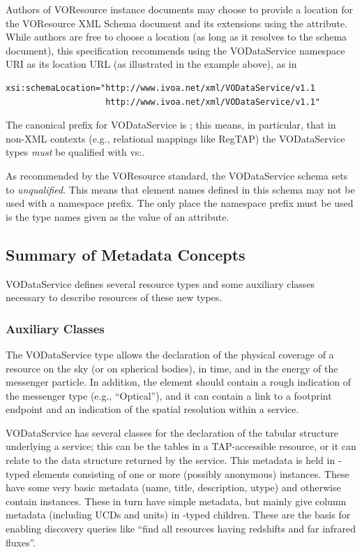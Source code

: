 \documentclass[11pt,a4paper]{ivoa}
\begin{document}
Authors of VOResource instance documents may choose to
provide a location for the VOResource XML Schema document and its
extensions using the
 attribute.  While authors are free to
choose a location (as long as it resolves to the schema document), this
specification
recommends using the VODataService namespace URI as its location URL
(as illustrated in the example above), as in
\begin{verbatim}
xsi:schemaLocation="http://www.ivoa.net/xml/VODataService/v1.1
                    http://www.ivoa.net/xml/VODataService/v1.1"
\end{verbatim}

The canonical prefix for VODataService is ; this means, in
particular, that in non-XML contexts (e.g., relational mappings
like RegTAP) the VODataService types \emph{must} be qualified with
vs:.

As recommended by the VOResource standard, the
VODataService schema sets  to \emph{unqualified}.
This means that element names defined
in this schema may not be used with a namespace prefix.
The only place the namespace prefix must be used is the
type names given as the value of an
 attribute.  


\subsection{Summary of Metadata Concepts}
\label{sect:summ}


VODataService defines several resource types and some auxiliary classes
necessary to describe resources of these new types.

\subsubsection{Auxiliary Classes}

The VODataService type  allows the declaration of
the physical coverage of a resource on the sky (or on spherical bodies),
in time, and in the energy of the messenger particle.  In addition, the
element should contain a rough indication of the messenger type
(e.g., ``Optical''), and it can contain a link to a footprint endpoint and an
indication of the spatial resolution within a service.

VODataService has several classes for the declaration of the tabular
structure underlying a service; this can be the tables in a
TAP-accessible resource,
or it can relate to the data structure returned by the service.  This
metadata is held in
-typed elements consisting 
of one or more (possibly anonymous)
 instances.  These have some very basic metadata
(name, title, description, utype) and otherwise contain 
instances.  These in turn have simple metadata, but mainly give column
metadata (including UCDs and units) in -typed
children.  These are the basis for enabling discovery queries like
``find all resources having redshifts and far infrared fluxes''.
\end{document}
